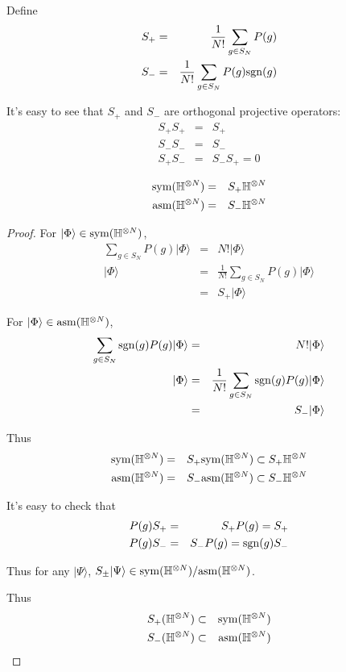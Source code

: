\documentclass[12pt]{book}
\begin{document}
	Define
	\begin{eqnarray}
		S_+&=&\frac 1{N!}\sum_{g\in S_N}P(g)\\
		S_-&=&\frac 1{N!}\sum_{g\in S_N}P(g){\rm sgn}(g)\\		
	\end{eqnarray}	
	
	It's easy to see that $S_+$ and $S_-$ are orthogonal projective operators:
	\begin{eqnarray}
		S_+S_+&=&S_+\\
		S_-S_-&=&S_-\\
		S_+S_-&=&S_-S_+=0
	\end{eqnarray}
		
	\begin{theorem}
		\begin{eqnarray}
			{\rm sym}(\mathbb H^{\otimes N})&=&S_+\mathbb H^{\otimes N}\\
			{\rm asm}(\mathbb H^{\otimes N})&=&S_-\mathbb H^{\otimes N}
		\end{eqnarray}
	\end{theorem}
	\begin{proof}
		For $|\Phi\rangle\in{\rm sym}(\mathbb H^{\otimes N})$,
		\begin{eqnarray}
			\sum_{g\in S_N}P(g)|\Phi\rangle&=&N!|\Phi\rangle\\
			|\Phi\rangle&=&\frac 1{N!}\sum_{g\in S_N}P(g)|\Phi\rangle\\
			&=&S_+|\Phi\rangle	
		\end{eqnarray}
		
		For $|\Phi\rangle\in{\rm asm}(\mathbb H^{\otimes N})$,
		\begin{eqnarray}
			\sum_{g\in S_N}{\rm sgn}(g)P(g)|\Phi\rangle&=&N!|\Phi\rangle\\
			|\Phi\rangle&=&\frac 1{N!}\sum_{g\in S_N}{\rm sgn}(g)P(g)|\Phi\rangle\\
			&=&S_-|\Phi\rangle		
		\end{eqnarray}
		
		Thus
		\begin{eqnarray}
			{\rm sym}(\mathbb H^{\otimes N})&=&S_+{\rm sym}(\mathbb H^{\otimes N})\subset S_+\mathbb H^{\otimes N}\\
			{\rm asm}(\mathbb H^{\otimes N})&=&S_-{\rm asm}(\mathbb H^{\otimes N})\subset S_-\mathbb H^{\otimes N}
		\end{eqnarray}
		
		It's easy to check that
		\begin{eqnarray}
			P(g)S_+&=&S_+P(g)=S_+\\
			P(g)S_-&=&S_-P(g)={\rm sgn}(g)S_-
		\end{eqnarray}
		
		Thus for any $|\Psi\rangle$, $S_\pm|\Psi\rangle\in{\rm sym}(\mathbb H^{\otimes N})/{\rm asm}(\mathbb H^{\otimes N})$.
		
		Thus
		\begin{eqnarray}
			S_+(\mathbb H^{\otimes N})&\subset&{\rm sym}(\mathbb H^{\otimes N})\\
			S_-(\mathbb H^{\otimes N})&\subset&{\rm asm}(\mathbb H^{\otimes N})
		\end{eqnarray}
	\end{proof}
	
\end{document}
